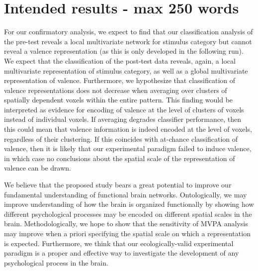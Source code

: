 \documentclass[12pt,a4paper]{article}\usepackage[]{graphicx}\usepackage[]{color}
\begin{document}
\section{Intended results \textmd{- max 250 words}}

For our confirmatory analysis, we expect to find that our classification analysis of the pre-test reveals a local multivariate network for stimulus category but cannot reveal a valence representation (as this is only developed in the following run). We expect that the classification of the post-test data reveals, again, a local multivariate representation of stimulus category, as well as a global multivariate representation of valence. Furthermore, we hypothesize that classification of valence representations does not decrease when averaging over clusters of spatially dependent voxels within the entire pattern. This finding would be interpreted as evidence for encoding of valence at the level of clusters of voxels instead of individual voxels. If averaging degrades classifier performance, then this could mean that valence information is indeed encoded at the level of voxels, regardless of their clustering. If this coincides with at-chance classification of valence, then it is likely that our experimental paradigm failed to induce valence, in which case no conclusions about the spatial scale of the representation of valence can be drawn.



We believe that the proposed study bears a great potential to improve our fundamental understanding of functional brain networks. Ontologically, we may improve understanding of how the brain is organized functionally by showing how different psychological processes may be encoded on different spatial scales in the brain. Methodologically, we hope to show that the sensitivity of MVPA analysis may improve when a priori specifying the spatial scale on which a representation is expected. Furthermore, we think that our ecologically-valid experimental paradigm is a proper and effective way to investigate the development of any psychological process in the brain. \\
\end{document}
